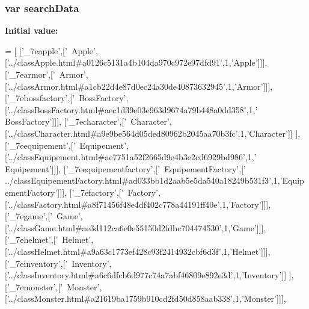\subsubsection[{search\-Data}]{\setlength{\rightskip}{0pt plus 5cm}var search\-Data}\label{functions__12_8js_ad01a7523f103d6242ef9b0451861231e}
{\bfseries Initial value\-:}
\begin{DoxyCode}
=
[
  [\textcolor{stringliteral}{'\_7eapple'},[\textcolor{stringliteral}{'~Apple'},[\textcolor{stringliteral}{'../classApple.html#a0126c5131a4b104da970c972e97dfd91'},1,\textcolor{stringliteral}{'Apple'}]]],
  [\textcolor{stringliteral}{'\_7earmor'},[\textcolor{stringliteral}{'~Armor'},[\textcolor{stringliteral}{'../classArmor.html#a1cb22d4e87d0ec24a30de40873632945'},1,\textcolor{stringliteral}{'Armor'}]]],
  [\textcolor{stringliteral}{'\_7ebossfactory'},[\textcolor{stringliteral}{'~BossFactory'},[\textcolor{stringliteral}{'../classBossFactory.html#aec1d39e03e963d9674a79b448a0dd358'},1,\textcolor{stringliteral}{'
      BossFactory'}]]],
  [\textcolor{stringliteral}{'\_7echaracter'},[\textcolor{stringliteral}{'~Character'},[\textcolor{stringliteral}{'../classCharacter.html#a9e9be564d05ded80962b2045aa70b3fc'},1,\textcolor{stringliteral}{'Character'}]]
      ],
  [\textcolor{stringliteral}{'\_7eequipement'},[\textcolor{stringliteral}{'~Equipement'},[\textcolor{stringliteral}{'../classEquipement.html#ae7751a52f2665d9e4b3e2cd6929bd986'},1,\textcolor{stringliteral}{'
      Equipement'}]]],
  [\textcolor{stringliteral}{'\_7eequipementfactory'},[\textcolor{stringliteral}{'~EquipementFactory'},[\textcolor{stringliteral}{'
      ../classEquipementFactory.html#ad033bb1d2aab5e5da540a18249b531f3'},1,\textcolor{stringliteral}{'EquipementFactory'}]]],
  [\textcolor{stringliteral}{'\_7efactory'},[\textcolor{stringliteral}{'~Factory'},[\textcolor{stringliteral}{'../classFactory.html#a8f71456f48e4df402c778a44191ff40e'},1,\textcolor{stringliteral}{'Factory'}]]],
  [\textcolor{stringliteral}{'\_7egame'},[\textcolor{stringliteral}{'~Game'},[\textcolor{stringliteral}{'../classGame.html#ae3d112ca6e0e55150d2fdbc704474530'},1,\textcolor{stringliteral}{'Game'}]]],
  [\textcolor{stringliteral}{'\_7ehelmet'},[\textcolor{stringliteral}{'~Helmet'},[\textcolor{stringliteral}{'../classHelmet.html#a9a63c1773ef428c93f2414932cbf6d3f'},1,\textcolor{stringliteral}{'Helmet'}]]],
  [\textcolor{stringliteral}{'\_7einventory'},[\textcolor{stringliteral}{'~Inventory'},[\textcolor{stringliteral}{'../classInventory.html#a6c6dfcb6d977c74a7abf46809e892e3d'},1,\textcolor{stringliteral}{'Inventory'}]]
      ],
  [\textcolor{stringliteral}{'\_7emonster'},[\textcolor{stringliteral}{'~Monster'},[\textcolor{stringliteral}{'../classMonster.html#a21619ba1759b910cd2fd50d858aab338'},1,\textcolor{stringliteral}{'Monster'}]]],

\end{DoxyCode}
